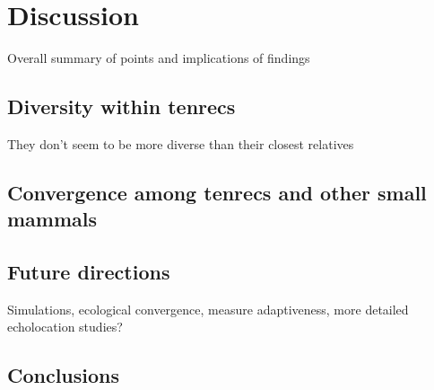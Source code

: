 \chapter{Discussion}
\label{chap:discussion}



\noindent
Overall summary of points and implications of findings

\section{Diversity within tenrecs}
They don't seem to be more diverse than their closest relatives



\section{Convergence among tenrecs and other small mammals}



\section{Future directions}
Simulations, ecological convergence, measure adaptiveness, more detailed echolocation studies?

\section{Conclusions}



